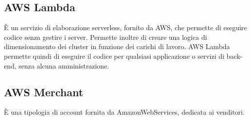 \subsection*{AWS Lambda} È un servizio di elaborazione serverless, fornito da AWS, che permette di eseguire codice senza gestire i server. Permette inoltre di creare una logica di dimensionamento dei cluster in funzione dei carichi di lavoro. AWS Lambda permette quindi di eseguire il codice per qualsiasi applicazione o servizi di back-end, senza alcuna amministrazione.
\subsection*{AWS Merchant} È una tipologia di account fornita da AmazonWebServices, dedicata ai venditori.
